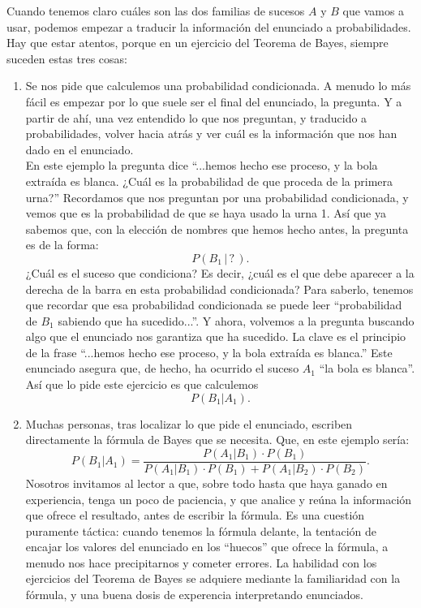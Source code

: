 \begin{Ejemplo}
    Cuando tenemos claro cuáles son las dos familias de sucesos $A$ y $B$ que vamos a usar, podemos empezar a traducir la información del enunciado a probabilidades. Hay que estar atentos, porque en un ejercicio del Teorema de Bayes, {\sf siempre} suceden estas tres cosas:
    \begin{enumerate}
        \item Se nos pide que calculemos una probabilidad condicionada. A menudo lo más fácil es empezar por lo que suele ser el final del enunciado, la pregunta. Y a partir de ahí, una vez entendido lo que nos preguntan, y traducido a probabilidades, volver hacia atrás y ver cuál es la información que nos han dado en el enunciado.\\
            En este ejemplo la pregunta dice ``...hemos hecho ese proceso, y la bola extraída es blanca. ¿Cuál es la probabilidad de que proceda de la primera urna?'' Recordamos que nos preguntan por una probabilidad condicionada, y vemos que es la probabilidad de que se haya usado la urna 1. Así que ya sabemos que, con la elección de nombres que hemos hecho antes, la pregunta es de la forma:
            \[P(B_1\,|\,?\,).\]
            ¿Cuál es el suceso que condiciona? Es decir, ¿cuál es el que debe aparecer a la derecha de la barra en esta probabilidad condicionada? Para saberlo, tenemos que recordar que esa probabilidad condicionada se puede leer ``probabilidad de $B_1$ sabiendo que ha sucedido...''. Y ahora, volvemos a la pregunta buscando algo que el enunciado {\sf nos garantiza que ha sucedido}. La clave es el principio de la frase ``...hemos hecho ese proceso, y la bola extraída es blanca.'' Este enunciado asegura que, de hecho, ha ocurrido el suceso $A_1$ ``la bola es blanca''. Así que lo pide este ejercicio es que calculemos
            \[P(B_1 | A_1).\]
        \item Muchas personas, tras localizar lo que pide el enunciado, escriben directamente la fórmula de Bayes que se necesita. Que, en este ejemplo sería:
            \[P(B_1 | A_1)=\dfrac{P(A_1 | B_1)\cdot P(B_1)}{P(A_1 | B_1)\cdot P(B_1)+P(A_1 | B_2)\cdot P(B_2)}.\]
            Nosotros invitamos al lector a que, sobre todo hasta que haya ganado en experiencia, tenga un poco de paciencia, y que analice y reúna la información que ofrece el resultado, {\sf antes} de escribir la fórmula. Es una cuestión puramente táctica: cuando tenemos la fórmula delante, la tentación de encajar los valores del enunciado en los ``huecos'' que ofrece la fórmula, a menudo nos hace precipitarnos y cometer errores. La habilidad con los ejercicios del Teorema de Bayes se adquiere mediante la familiaridad  con la fórmula, y una buena dosis de experencia interpretando enunciados.


\end{enumerate}
\end{Ejemplo}
